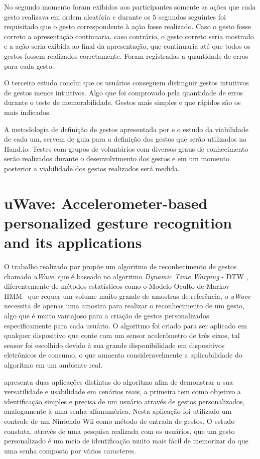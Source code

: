 No segundo momento foram exibidos aos participantes somente as ações que cada gesto realizava em ordem aleatória e durante os $5$ segundos seguintes foi requisitado que o gesto correspondente à ação fosse realizado. Caso o gesto fosse correto a apresentação continuaria, caso contrário, o gesto correto seria mostrado e a ação seria exibida ao final da apresentação, que continuaria até que todos os gestos fossem realizados corretamente. Foram registradas a quantidade de erros para cada gesto.

O terceiro estudo conclui que os usuários conseguem distinguir gestos intuitivos de gestos menos intuitivos. Algo que foi comprovado pela quantidade de erros durante o teste de memorabilidade. Gestos mais simples e que rápidos são os mais indicados.

A metodologia de definição de gestos apresentada por  e o estudo da viabilidade de cada um, servem de guia para a definição dos gestos que serão utilizados na Hand.io. Testes com grupos de voluntários com diversos graus de conhecimento serão realizados durante o desenvolvimento dos gestos e em um momento posterior a viabilidade dos gestos realizados será medida.



\section{uWave: Accelerometer-based personalized gesture recognition and its applications}
\label{cor:uwave}

O trabalho realizado por  propõe um algoritmo de reconhecimento de gestos chamado \textit{uWave}, que é baseado no algoritmo \textit{Dynamic Time Warping} - DTW \cite{Salvador:2007}, diferentemente de métodos estatísticos como o Modelo Oculto de Markov - HMM~\cite{hmm:1989} que requer um volume muito grande de amostras de referência, o \textit{uWave} necessita de apenas uma amostra para realizar o reconhecimento de um gesto, algo que é muito vantajoso para a criação de gestos personalizados especificamente para cada usuário. O algoritmo foi criado para ser aplicado em qualquer dispositivo que conte com um sensor acelerômetro de três eixos, tal sensor foi escolhido devido à sua grande disponibilidade em dispositivos eletrônicos de consumo, o que aumenta consideravelmente a aplicabilidade do algoritmo em um ambiente real.

 apresenta duas aplicações distintas do algoritmo afim de demonstrar a sua versatilidade e usabilidade em cenários reais, a primeira tem como objetivo a identificação simples e precisa de um usuário através de gestos personalizados, analogamente à uma senha alfanumérica. Nesta aplicação foi utilizado um controle de um Nintendo Wii  como método de entrada de gestos. O estudo constata, através de uma pesquisa realizada com os usuários, que um gesto personalizado é um meio de identificação muito mais fácil de memorizar do que uma senha composta por vários caracteres. 

